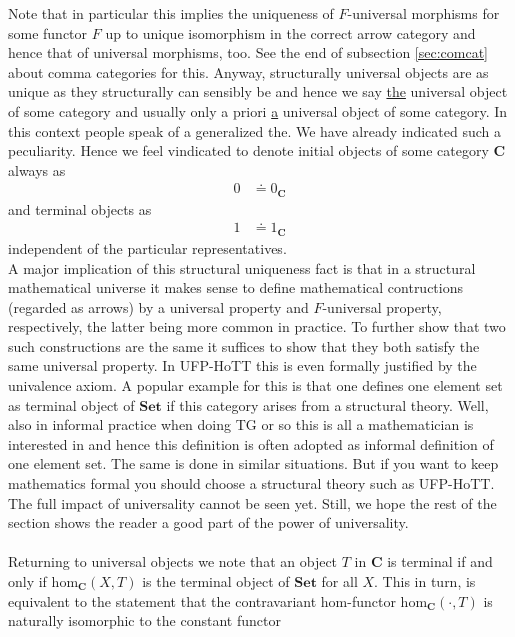 Note that in particular this implies the uniqueness of $F$-universal morphisms for some functor $F$ up to unique isomorphism in the correct arrow category and hence that of universal morphisms, too. See the end of subsection \ref{sec:comcat} about comma categories for this. Anyway, structurally universal objects are as unique as they structurally can sensibly be and hence we say \underline{the} universal object of some category and usually only a priori \underline{a} universal object of some category. In this context people speak of a generalized {\glqq}the{\grqq}. We have already indicated such a peculiarity. Hence we feel vindicated to denote initial objects of some category $\mathbf{C}$ always as 
\begin{align*}
  0
  &\doteq
  0_{\mathbf{C}}
\end{align*}
and terminal objects as 
\begin{align*}
  1
  &\doteq
  1_{\mathbf{C}}
\end{align*}
independent of the particular representatives.
\\
A major implication of this structural uniqueness fact is that in a structural mathematical universe it makes sense to define mathematical contructions (regarded as arrows) by a universal property and $F$-universal property, respectively, the latter being more common in practice. To further show that two such constructions are the same it suffices to show that they both satisfy the same universal property. In UFP-HoTT this is even formally justified by the univalence axiom. A popular example for this is that one defines {\glqq}one element set{\grqq} as terminal object of $\mathbf{Set}$ if this category arises from a structural theory. Well, also in informal practice when doing TG or so this is all a mathematician is interested in and hence this definition is often adopted as informal definition of {\glqq}one element set{\grqq}. The same is done in similar situations. But if you want to keep mathematics formal you should choose a structural theory such as UFP-HoTT. The full impact of universality cannot be seen yet. Still, we hope the rest of the section shows the reader a good part of the power of universality.
\\\\
Returning to universal objects we note that an object $T$ in $\mathbf{C}$ is terminal if and only if $\mathrm{hom}_{\mathbf{C}}(X,T)$ is the terminal object of $\mathbf{Set}$ for all $X$. This in turn, is equivalent to the statement that the contravariant hom-functor $\mathrm{hom}_{\mathbf{C}}(\cdot,T)$ is naturally isomorphic to the constant functor
